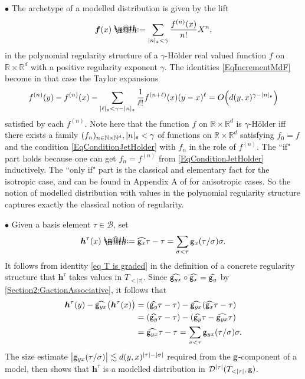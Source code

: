 \documentclass[10pt, reqno]{amsart}
\makeatletter
\numberwithin{subsection}{section}
\numberwithin{subsubsection}{subsection}
\numberwithin{equation}{section} %
\newenvironment{Examples}[1][\unskip]{%
    \begin{list}{\hspace{1.15cm}{\textsf{\textbf{{\small \textsl{Examples}} }}}}{%
        \setlength{\topsep}{0pt}%
        \setlength{\leftmargin}{0pt}%
        \setlength{\rightmargin}{0pt}%
        \setlength{\listparindent}{0pt}%
        \setlength{\itemindent}{0pt}%
        \setlength{\parsep}{0pt}%
        \addtolength{\leftmargin}{20pt}%
        \addtolength{\rightmargin}{0pt}%
    } \item }{\hfill \end{list}\smallskip}
\theoremstyle{mystyle}
\theoremstyle{mystyle2}
\theoremstyle{mystyle3}
\newcommand{\bsf}{\boldsymbol{f}}
\newcommand{\bsh}{\boldsymbol{h}}
\newcommand{\ssk}{\smallskip}
\newcommand\bbN{\mathbb{N}}
\newcommand\bbR{\mathbb{R}}
\newcommand{\mcB}{\mathcal{B}}
\newcommand{\mcD}{\mathcal{D}}
\newcommand*{\defeq}{\mathrel{\rlap{%
                     \raisebox{0.3ex}{$\m@th\cdot$}}%
                     \raisebox{-0.3ex}{$\m@th\cdot$}}%
                     =}
\makeatother
\begin{document}
{\small {\sl \begin{Examples} $\bullet$ The archetype of a modelled distribution is given by the lift 
\begin{equation} \label{EqLiftHolder}
\bsf(x) \defeq  \sum_{\vert n\vert_{\frak{s}} < \gamma} \frac{f^{(n)}(x)}{n!} X^n,
\end{equation}
in the polynomial regularity structure of a $\gamma$-H\"older real valued 
function $f$ on $\bbR\times\bbR^d$ with a positive regularity exponent $\gamma$. The identities \eqref{EqIncrementMdF} become in that case the Taylor expansions
\begin{equation} \label{EqConditionJetHolder}
f^{(n)}(y) - f^{(n)}(x) - \sum_{\vert\ell\vert_{\frak{s}}<\gamma-\vert n\vert_{\frak{s}}} \frac1{\ell!} f^{(n+\ell)}(x) (y-x)^\ell = O\Big(d(y,x)^{\gamma-\vert n\vert_\frak{s}}\Big)
\end{equation}
satisfied by each $f^{(n)}$. Note here that the function $f$ on $\bbR\times\bbR^d$ is $\gamma$-H\"older iff there exists a family $(f_n)_{n\in\bbN\times\bbN^d},\vert n\vert_\frak{s}<\gamma$ of functions on $\bbR\times\bbR^d$ satisfying $f_0=f$ and the condition \eqref{EqConditionJetHolder} with $f_n$ in the role of $f^{(n)}$. The ``if" part holds because one can get $f_n=f^{(n)}$ from \eqref{EqConditionJetHolder} inductively. The ``only if" part is the classical and elementary fact for the isotropic case, and can be found in Appendix {\sf A} of \cite{Hai14} for anisotropic cases. So the notion of modelled distribution with values in the polynomial regularity structure captures exactly the classical notion of regularity.

\ssk

$\bullet$ Given a basis element $\tau\in \mcB$, set
\begin{equation}
\label{EqDefnMdTau}
\bsh^\tau(x) \defeq  
\widehat{{\sf g}_x}\tau-\tau =
\sum_{\sigma<\tau}{\sf g}_x(\tau/\sigma)\sigma.
\end{equation}
It follows from identity \eqref{eq T is graded} in the definition of a concrete regularity structure that $\bsh^\tau$ takes values in $T_{<\vert\tau\vert}$. 
Since $\widehat{{\sf g}_{yx}}\circ\widehat{{\sf g}_x}=\widehat{{\sf g}_y}$ by \eqref{Section2:GactionAssociative}, it follows that
\begin{align*}
\bsh^\tau(y)-\widehat{{\sf g}_{yx}}\big(\bsh^\tau(x)\big)
&=(\widehat{{\sf g}_y}\tau-\tau)-\widehat{{\sf g}_{yx}}(\widehat{{\sf g}_x}\tau-\tau)\\
&=(\widehat{{\sf g}_y}\tau-\tau)-(\widehat{{\sf g}_y}\tau-\widehat{{\sf g}_{yx}}\tau)\\
&=\widehat{{\sf g}_{yx}}\tau-\tau=
\sum_{\sigma<\tau}{\sf g}_{yx}(\tau/\sigma)\sigma.
\end{align*}
The size estimate $\big|{\sf g}_{yx}(\tau/\sigma)\big| \lesssim d(y,x)^{|\tau|-|\sigma|}$ required from the $\sf g$-component of a model, then shows that $\bsh^\tau$ is a modelled distribution in $\mcD^{|\tau|}(T_{<|\tau|}, 
{\sf g})$.


\end{Examples}}}
\end{document}
